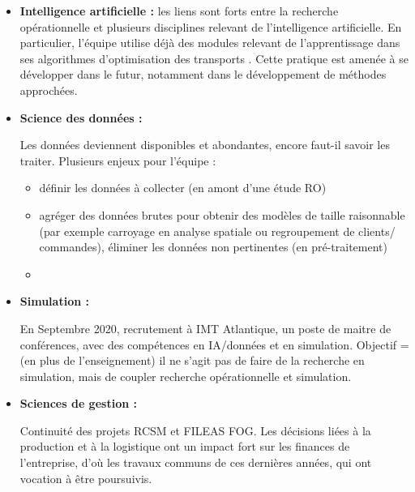 	\begin{itemize}
	    \item \textbf{Intelligence artificielle :} les liens sont forts entre la recherche opérationnelle et plusieurs disciplines relevant de l'intelligence artificielle. 
	    En particulier, l'équipe utilise déjà des modules relevant de l'apprentissage dans ses algorithmes d'optimisation des transports . 
	    Cette pratique est amenée à se développer dans le futur, notamment dans le développement de méthodes approchées. 
	    
	    
	    \item \textbf{Science des données : }
	    
	    Les données deviennent disponibles et abondantes, encore faut-il savoir les traiter. Plusieurs enjeux pour l'équipe \slp : 
	    \begin{itemize}
	        \item définir les données à collecter (en amont d'une étude RO)
	        \item agréger des données brutes pour obtenir des modèles de taille raisonnable (par exemple carroyage en analyse spatiale ou regroupement de clients/ commandes), éliminer les données non pertinentes (en pré-traitement)
	        \item {}
	    \end{itemize}
	    
	    \item \textbf{Simulation : }
	    
	    En Septembre 2020, recrutement à IMT Atlantique, un poste de maitre de conférences, avec des compétences en IA/données et en simulation. 
	    Objectif = (en plus de l'enseignement) il ne s'agit pas de faire de la recherche en simulation, mais de coupler recherche opérationnelle et simulation.
	    
	    
	    \item \textbf{Sciences de gestion : }
	    
	    
	    Continuité des projets RCSM et FILEAS FOG. Les décisions liées à la production et à la logistique ont un impact fort sur les finances de l'entreprise, d'où les travaux communs de ces dernières années, qui ont vocation à être poursuivis. 
	    

\end{itemize}
